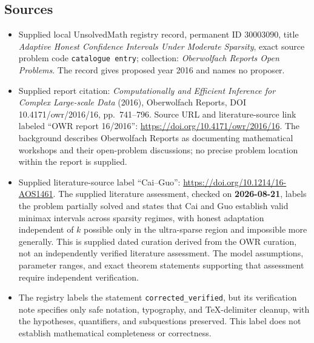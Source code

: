 \documentclass[11pt]{article}
\begin{document}
\subsection{Sources}
\begin{itemize}
\item Supplied local UnsolvedMath registry record, permanent ID \(30003090\), title \emph{Adaptive Honest Confidence Intervals Under Moderate Sparsity}, exact source problem code \texttt{catalogue entry}; collection: \emph{Oberwolfach Reports Open Problems}. The record gives proposed year 2016 and names no proposer.
\item Supplied report citation: \emph{Computationally and Efficient Inference for Complex Large-scale Data} (2016), Oberwolfach Reports, DOI 10.4171/owr/2016/16, pp.\ 741--796. Source URL and literature-source link labeled ``OWR report 16/2016'': \url{https://doi.org/10.4171/owr/2016/16}. The background describes Oberwolfach Reports as documenting mathematical workshops and their open-problem discussions; no precise problem location within the report is supplied.
\item Supplied literature-source label ``Cai--Guo'': \url{https://doi.org/10.1214/16-AOS1461}. The supplied literature assessment, checked on \textbf{2026-08-21}, labels the problem partially solved and states that Cai and Guo establish valid minimax intervals across sparsity regimes, with honest adaptation independent of \(k\) possible only in the ultra-sparse region and impossible more generally. This is supplied dated curation derived from the OWR curation, not an independently verified literature assessment. The model assumptions, parameter ranges, and exact theorem statements supporting that assessment require independent verification.
\item The registry labels the statement \texttt{corrected\_verified}, but its verification note specifies only safe notation, typography, and TeX-delimiter cleanup, with the hypotheses, quantifiers, and subquestions preserved. This label does not establish mathematical completeness or correctness.
\end{itemize}
\end{document}
